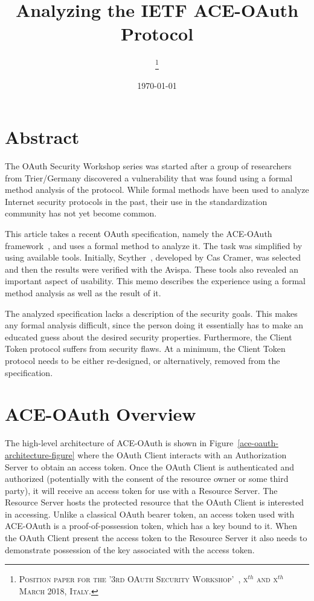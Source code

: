 \documentclass[peerreview, a4paper, 7pt]{IEEEtran}
\begin{document}
\title{Analyzing the IETF ACE-OAuth Protocol}

\author{
\thanks{\textsc{Position paper for the '3rd OAuth Security Workshop'~\cite{OSW2018}, x$^{th}$ and x$^{th}$ March 2018, Italy.}}
}

\date{\today}

\maketitle


\section{Abstract}

The OAuth Security Workshop series was started after a group of researchers from Trier/Germany discovered a vulnerability that was found using a formal method analysis of the protocol. While formal methods have been used to analyze Internet security protocols in the past, their use in the standardization community has not yet become common.

This article takes a recent OAuth specification, namely the ACE-OAuth framework~\cite{draft-ietf-ace-oauth-authz-09}, and uses a formal method to analyze it. The task was simplified by using available tools. Initially, Scyther~\cite{Scyther}, developed by Cas Cramer, was selected and then the results were verified with the Avispa. These tools also revealed an important aspect of usability. This memo describes the experience using a formal method analysis as well as the result of it. 

The analyzed specification lacks a description of the security goals. This makes any formal analysis difficult, since the person doing it essentially has to make an educated guess about the desired security properties. Furthermore, the Client Token protocol suffers from security flaws. At a minimum, the Client Token protocol needs to be either re-designed, or alternatively, removed from the specification.

\section{ACE-OAuth Overview}
\label{lwm2m}

The high-level architecture of ACE-OAuth is shown in Figure~\ref{ace-oauth-architecture-figure} where the OAuth Client interacts with an Authorization Server to obtain an access token. Once the OAuth Client is authenticated and authorized (potentially with the consent of the resource owner or some third party), it will receive an access token for use with a Resource Server. The Resource Server hosts the protected resource that the OAuth Client is interested in accessing. Unlike a classical OAuth bearer token, an access token used with ACE-OAuth is a proof-of-possession token, which has a key bound to it. When the OAuth Client present the access token to the Resource Server it also needs to demonstrate possession of the key associated with the access token.
\end{document}

